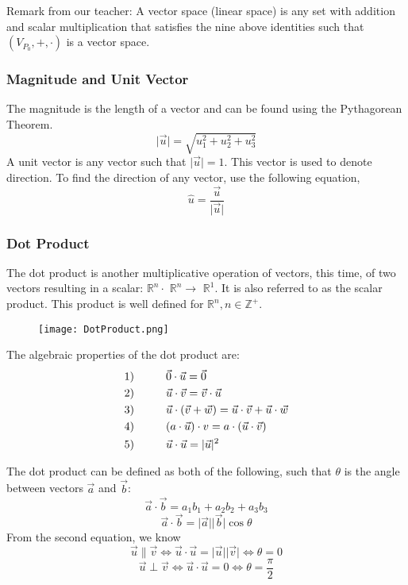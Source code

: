 \documentclass{article}
\begin{document}
Remark from our teacher: A vector space (linear space) is any set with addition and scalar multiplication that satisfies the nine above identities such that $(V_{P_0},+,\cdot)$ is a vector space.    

\subsubsection{Magnitude and Unit Vector}
The magnitude is the length of a vector and can be found using the Pythagorean Theorem. 
$$\lvert \vec{u} \rvert = \sqrt{u_1^2 + u_2^2 + u_3^2}$$
A unit vector is any vector such that $\lvert \vec{u} \rvert = 1$. This vector is used to denote direction. To find the direction of any vector, use the following equation, 
$$\hat{u} = \frac{\vec{u}}{\lvert \vec{u} \rvert}$$

\subsubsection{Dot Product}
The dot product is another multiplicative operation of vectors, this time, of two vectors resulting in a scalar: $\mathbb{R}^n \cdot$ $\mathbb{R}^n \longrightarrow$ $\mathbb{R}^1$. It is also referred to as the scalar product. This product is well defined for $\mathbb{R}^n, n \in \mathbb{Z}^+$.

\begin{wrapfigure}{r}{0.45\textwidth}
    \texttt{[image: DotProduct.png]}
    \label{fig:enter-label-2}
\end{wrapfigure}
The algebraic properties of the dot product are:
\begin{align*}
    &1)\hspace{1 cm} \vec{0}\cdot\vec{u}=\vec{0} \\
    &2)\hspace{1 cm} \vec{u}\cdot\vec{v}=\vec{v}\cdot\vec{u} \\
    &3)\hspace{1 cm} \vec{u}\cdot(\vec{v}+\vec{w})=\vec{u}\cdot\vec{v}+\vec{u}\cdot\vec{w}\\
    &4)\hspace{1 cm} (a\cdot\vec{u})\cdot{v}=a\cdot(\vec{u}\cdot\vec{v})\\
    &5)\hspace{1 cm} \vec{u}\cdot\vec{u}=|\vec{u}|^2
\end{align*}

The dot product can be defined as both of the following, such that $\theta$ is the angle between vectors $\vec{a}$ and $\vec{b}$:
$$\vec{a} \cdot \vec{b} = a_1b_1 + a_2b_2 + a_3b_3$$
$$\vec{a} \cdot \vec{b} = \lvert \vec{a} \rvert \lvert \vec{b} \rvert \cos{\theta}$$
From the second equation, we know 
$$\vec{u} \parallel \vec{v} \Leftrightarrow \vec{u} \cdot \vec{u} = \lvert \vec{u} \rvert \lvert \vec{v} \rvert \Leftrightarrow \theta = 0$$
$$\vec{u} \perp \vec{v} \Leftrightarrow \vec{u} \cdot \vec{u} = 0 \Leftrightarrow \theta = \frac{\pi}{2}$$
\end{document}
